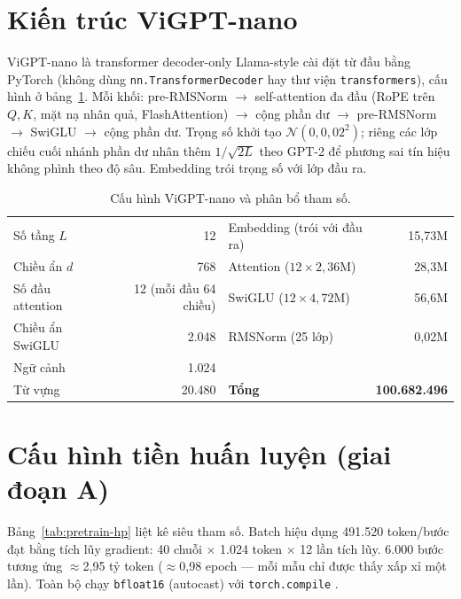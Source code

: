 \section{Kiến trúc ViGPT-nano}
\label{sec:met-arch}

ViGPT-nano là transformer decoder-only Llama-style cài đặt từ đầu bằng
PyTorch (không dùng \texttt{nn.TransformerDecoder} hay thư viện
\texttt{transformers}), cấu hình ở bảng~\ref{tab:arch}. Mỗi khối:
pre-RMSNorm $\to$ self-attention đa đầu (RoPE trên $Q,K$, mặt nạ nhân quả,
FlashAttention) $\to$ cộng phần dư $\to$ pre-RMSNorm $\to$ SwiGLU $\to$ cộng
phần dư. Trọng số khởi tạo $\mathcal{N}(0, 0{,}02^2)$; riêng các lớp chiếu
cuối nhánh phần dư nhân thêm $1/\sqrt{2L}$ theo GPT-2
\autocite{radford2019gpt2} để phương sai tín hiệu không phình theo độ sâu.
Embedding trói trọng số với lớp đầu ra.

\begin{table}[H]
	\centering
	\caption{Cấu hình ViGPT-nano và phân bổ tham số.}
	\label{tab:arch}
	\begin{tabular}{lr|lr}
		\hline
		Số tầng $L$ & 12 & Embedding (trói với đầu ra) & 15,73M \\
		Chiều ẩn $d$ & 768 & Attention ($12 \times 2{,}36$M) & 28,3M \\
		Số đầu attention & 12 (mỗi đầu 64 chiều) & SwiGLU ($12 \times 4{,}72$M) & 56,6M \\
		Chiều ẩn SwiGLU & 2.048 & RMSNorm (25 lớp) & 0,02M \\
		Ngữ cảnh & 1.024 & & \\
		Từ vựng & 20.480 & \textbf{Tổng} & \textbf{100.682.496} \\
		\hline
	\end{tabular}
\end{table}

\section{Cấu hình tiền huấn luyện (giai đoạn A)}
\label{sec:met-pretrain}

Bảng~\ref{tab:pretrain-hp} liệt kê siêu tham số. Batch hiệu dụng 491.520
token/bước đạt bằng tích lũy gradient: 40 chuỗi $\times$ 1.024 token
$\times$ 12 lần tích lũy. 6.000 bước tương ứng $\approx$2,95 tỷ token
($\approx$0,98 epoch --- mỗi mẫu chỉ được thấy xấp xỉ một lần). Toàn bộ chạy
\texttt{bfloat16} (autocast) với \texttt{torch.compile}
\autocite{ansel2024pytorch2}.

